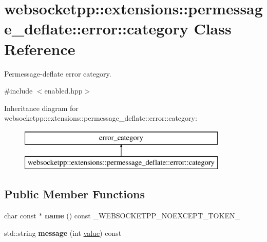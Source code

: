 \hypertarget{classwebsocketpp_1_1extensions_1_1permessage__deflate_1_1error_1_1category}{}\section{websocketpp\+:\+:extensions\+:\+:permessage\+\_\+deflate\+:\+:error\+:\+:category Class Reference}
\label{classwebsocketpp_1_1extensions_1_1permessage__deflate_1_1error_1_1category}


Permessage-\/deflate error category.  




{\ttfamily \#include $<$enabled.\+hpp$>$}

Inheritance diagram for websocketpp\+:\+:extensions\+:\+:permessage\+\_\+deflate\+:\+:error\+:\+:category\+:\begin{figure}[H]
\begin{center}
\leavevmode
\includegraphics[height=2.000000cm]{classwebsocketpp_1_1extensions_1_1permessage__deflate_1_1error_1_1category}
\end{center}
\end{figure}
\subsection*{Public Member Functions}
\begin{DoxyCompactItemize}
\item 
char const  $\ast$ {\bfseries name} () const \+\_\+\+W\+E\+B\+S\+O\+C\+K\+E\+T\+P\+P\+\_\+\+N\+O\+E\+X\+C\+E\+P\+T\+\_\+\+T\+O\+K\+E\+N\+\_\+\hypertarget{classwebsocketpp_1_1extensions_1_1permessage__deflate_1_1error_1_1category_a042aa64aca0a9118cda65c25e8fbb83b}{}\label{classwebsocketpp_1_1extensions_1_1permessage__deflate_1_1error_1_1category_a042aa64aca0a9118cda65c25e8fbb83b}

\item 
std\+::string {\bfseries message} (int \hyperlink{namespacewebsocketpp_1_1extensions_1_1permessage__deflate_1_1error_a38e53d7586dd60059cc99a5833bbe54e}{value}) const\hypertarget{classwebsocketpp_1_1extensions_1_1permessage__deflate_1_1error_1_1category_a1c1ff476766b3f9bb115a92ec809c01e}{}\label{classwebsocketpp_1_1extensions_1_1permessage__deflate_1_1error_1_1category_a1c1ff476766b3f9bb115a92ec809c01e}

\end{DoxyCompactItemize}


